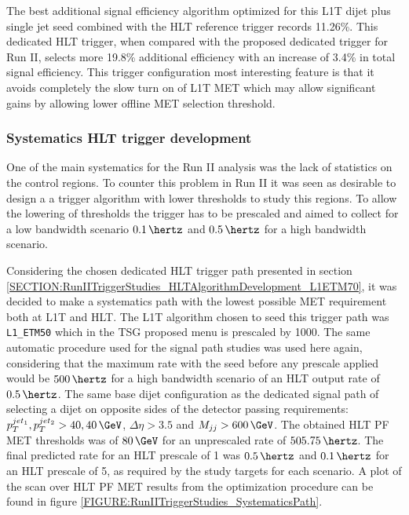 The best additional signal efficiency algorithm optimized for this \gls{L1T} dijet plus single jet seed combined with the \gls{HLT} reference trigger records 11.26\%. This dedicated \gls{HLT} trigger, when compared with the proposed dedicated trigger for Run II, selects more 19.8\% additional efficiency with an increase of 3.4\% in total signal efficiency. This trigger configuration most interesting feature is that it avoids completely the slow turn on of \gls{L1T} \gls{MET} which may allow significant gains by allowing lower offline \gls{MET} selection threshold.

\subsubsection{Systematics HLT trigger development}
\label{SECTION:RunIITriggerStudies_HLTAlgorithmDevelopment_SystematicsPath}

One of the main systematics for the Run II analysis was the lack of statistics on the control regions. To counter this problem in Run II it was seen as desirable to design a a trigger algorithm with lower thresholds to study this regions. To allow the lowering of thresholds the trigger has to be prescaled and aimed to collect for a low bandwidth scenario $0.1\,\hertz$ and $0.5\,\hertz$ for a high bandwidth scenario.

Considering the chosen dedicated \gls{HLT} trigger path presented in section \ref{SECTION:RunIITriggerStudies_HLTAlgorithmDevelopment_L1ETM70}, it was decided to make a systematics path with the lowest possible \gls{MET} requirement both at \gls{L1T} and \gls{HLT}. The \gls{L1T} algorithm chosen to seed this trigger path was \verb|L1_ETM50| which in the \gls{TSG} proposed menu is prescaled by 1000. The same automatic procedure used for the signal path studies was used here again, considering that the maximum rate with the seed before any prescale applied would be $500\,\hertz$ for a high bandwidth scenario of an \gls{HLT} output rate of $0.5\,\hertz$. The same base dijet configuration as the dedicated signal path of selecting a dijet on opposite sides of the detector passing requirements: $p_T^{jet_1},p_T^{jet_2}>40,40\,\GeV$, $\Delta\eta>3.5$ and $M_{jj}>600\,\GeV$. The obtained \gls{HLT} \gls{PF} \gls{MET} thresholds was of $80\,\GeV$ for an unprescaled rate of $505.75\,\hertz$. The final predicted rate for an \gls{HLT} prescale of 1  was $0.5\,\hertz$ and $0.1\,\hertz$ for an \gls{HLT} prescale of 5, as required by the study targets for each scenario. A plot of the scan over \gls{HLT} \gls{PF} \gls{MET} results from the optimization procedure can be found in figure \ref{FIGURE:RunIITriggerStudies_SystematicsPath}.

